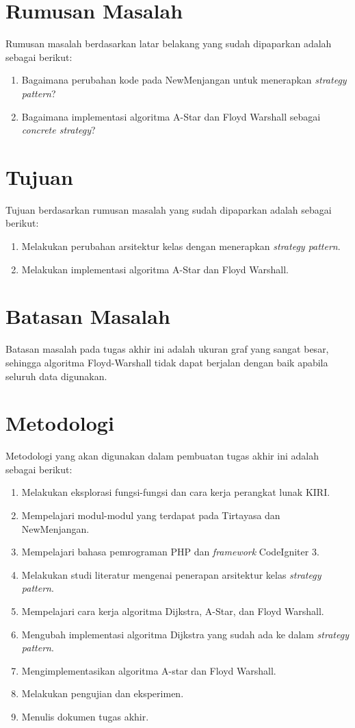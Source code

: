 \section{Rumusan Masalah}
\label{sec:rumusan}
Rumusan masalah berdasarkan latar belakang yang sudah dipaparkan adalah sebagai berikut:
\begin{enumerate}
    \item Bagaimana perubahan kode pada NewMenjangan untuk menerapkan \textit{strategy pattern}?
    \item Bagaimana implementasi algoritma A-Star dan Floyd Warshall sebagai \textit{concrete strategy}?
\end{enumerate}

\section{Tujuan}
\label{sec:tujuan}
Tujuan berdasarkan rumusan masalah yang sudah dipaparkan adalah sebagai berikut:
\begin{enumerate}
    \item Melakukan perubahan arsitektur kelas dengan menerapkan \textit{strategy pattern}.
    \item Melakukan implementasi algoritma A-Star dan Floyd Warshall.
\end{enumerate}

\section{Batasan Masalah}
\label{sec:batasan}
Batasan masalah pada tugas akhir ini adalah ukuran graf yang sangat besar, sehingga algoritma Floyd-Warshall tidak dapat berjalan dengan baik apabila seluruh data digunakan.

\section{Metodologi}
\label{sec:metlit}
Metodologi yang akan digunakan dalam pembuatan tugas akhir ini adalah sebagai berikut:
	\begin{enumerate}
		\item Melakukan eksplorasi fungsi-fungsi dan cara kerja perangkat lunak KIRI.
		\item Mempelajari modul-modul yang terdapat pada Tirtayasa dan NewMenjangan.
		\item Mempelajari bahasa pemrograman PHP dan \textit{framework} CodeIgniter 3.
		\item Melakukan studi literatur mengenai penerapan arsitektur kelas \textit{strategy pattern}.
    		\item Mempelajari cara kerja algoritma Dijkstra, A-Star, dan Floyd Warshall.
    		\item Mengubah implementasi algoritma Dijkstra yang sudah ada ke dalam \textit{strategy pattern}.
    		\item Mengimplementasikan algoritma A-star dan Floyd Warshall.
    		\item Melakukan pengujian dan eksperimen.
    		\item Menulis dokumen tugas akhir.
	\end{enumerate}


